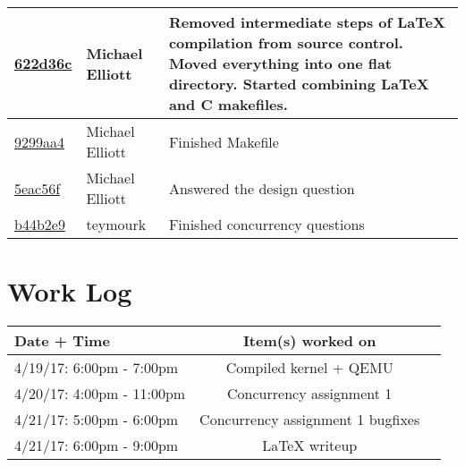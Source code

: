 \documentclass[letterpaper,10pt,titlepage,draftclsnofoot,onecolumn]{IEEEtran}
\begin{document}
\begin{tabular}{l l l}
\href{https://github.com/elliomic/CS-444/commit/622d36cfa52d8585b434b9eea93ceb2294168507}{622d36c} & Michael Elliott & Removed intermediate steps of LaTeX compilation from source control. Moved everything into one flat directory. Started combining LaTeX and C makefiles.\\\hline
\href{https://github.com/elliomic/CS-444/commit/9299aa4a74db60c7cd19fd008c48fe449511c4ec}{9299aa4} & Michael Elliott & Finished Makefile\\\hline
\href{https://github.com/elliomic/CS-444/commit/5eac56f022bbc2c253f71597fe0543cf030e1ed8}{5eac56f} & Michael Elliott & Answered the design question\\\hline
\href{https://github.com/elliomic/CS-444/commit/b44b2e9e6f66bb027e0bf7568dd80d9d78853b6f}{b44b2e9} & teymourk & Finished concurrency questions\\\hline\end{tabular}



\section{Work Log}
\begin{tabular}{l | c | r}
Date + Time & Item(s) worked on \\
\hline
4/19/17: 6:00pm - 7:00pm & Compiled kernel + QEMU \\
4/20/17: 4:00pm - 11:00pm & Concurrency assignment 1 \\
4/21/17: 5:00pm - 6:00pm & Concurrency assignment 1 bugfixes \\
4/21/17: 6:00pm - 9:00pm & LaTeX writeup \\
\end{tabular}

\nocite{*}



\end{document}
